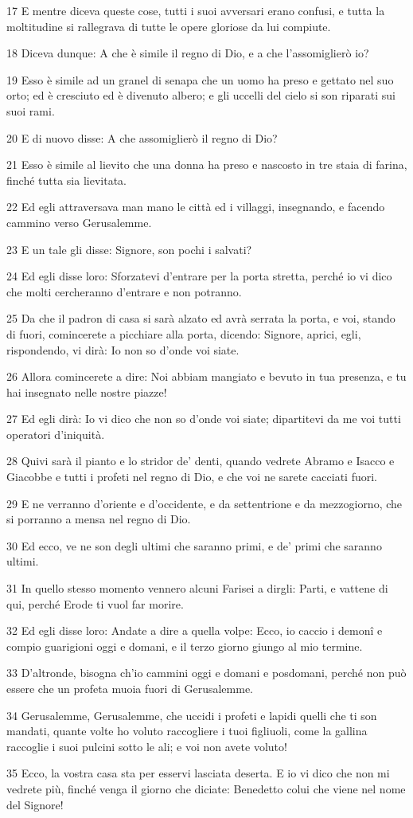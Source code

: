 \par 17 E mentre diceva queste cose, tutti i suoi avversari erano confusi, e tutta la moltitudine si rallegrava di tutte le opere gloriose da lui compiute.
\par 18 Diceva dunque: A che è simile il regno di Dio, e a che l'assomiglierò io?
\par 19 Esso è simile ad un granel di senapa che un uomo ha preso e gettato nel suo orto; ed è cresciuto ed è divenuto albero; e gli uccelli del cielo si son riparati sui suoi rami.
\par 20 E di nuovo disse: A che assomiglierò il regno di Dio?
\par 21 Esso è simile al lievito che una donna ha preso e nascosto in tre staia di farina, finché tutta sia lievitata.
\par 22 Ed egli attraversava man mano le città ed i villaggi, insegnando, e facendo cammino verso Gerusalemme.
\par 23 E un tale gli disse: Signore, son pochi i salvati?
\par 24 Ed egli disse loro: Sforzatevi d'entrare per la porta stretta, perché io vi dico che molti cercheranno d'entrare e non potranno.
\par 25 Da che il padron di casa si sarà alzato ed avrà serrata la porta, e voi, stando di fuori, comincerete a picchiare alla porta, dicendo: Signore, aprici, egli, rispondendo, vi dirà: Io non so d'onde voi siate.
\par 26 Allora comincerete a dire: Noi abbiam mangiato e bevuto in tua presenza, e tu hai insegnato nelle nostre piazze!
\par 27 Ed egli dirà: Io vi dico che non so d'onde voi siate; dipartitevi da me voi tutti operatori d'iniquità.
\par 28 Quivi sarà il pianto e lo stridor de' denti, quando vedrete Abramo e Isacco e Giacobbe e tutti i profeti nel regno di Dio, e che voi ne sarete cacciati fuori.
\par 29 E ne verranno d'oriente e d'occidente, e da settentrione e da mezzogiorno, che si porranno a mensa nel regno di Dio.
\par 30 Ed ecco, ve ne son degli ultimi che saranno primi, e de' primi che saranno ultimi.
\par 31 In quello stesso momento vennero alcuni Farisei a dirgli: Parti, e vattene di qui, perché Erode ti vuol far morire.
\par 32 Ed egli disse loro: Andate a dire a quella volpe: Ecco, io caccio i demonî e compio guarigioni oggi e domani, e il terzo giorno giungo al mio termine.
\par 33 D'altronde, bisogna ch'io cammini oggi e domani e posdomani, perché non può essere che un profeta muoia fuori di Gerusalemme.
\par 34 Gerusalemme, Gerusalemme, che uccidi i profeti e lapidi quelli che ti son mandati, quante volte ho voluto raccogliere i tuoi figliuoli, come la gallina raccoglie i suoi pulcini sotto le ali; e voi non avete voluto!
\par 35 Ecco, la vostra casa sta per esservi lasciata deserta. E io vi dico che non mi vedrete più, finché venga il giorno che diciate: Benedetto colui che viene nel nome del Signore!

